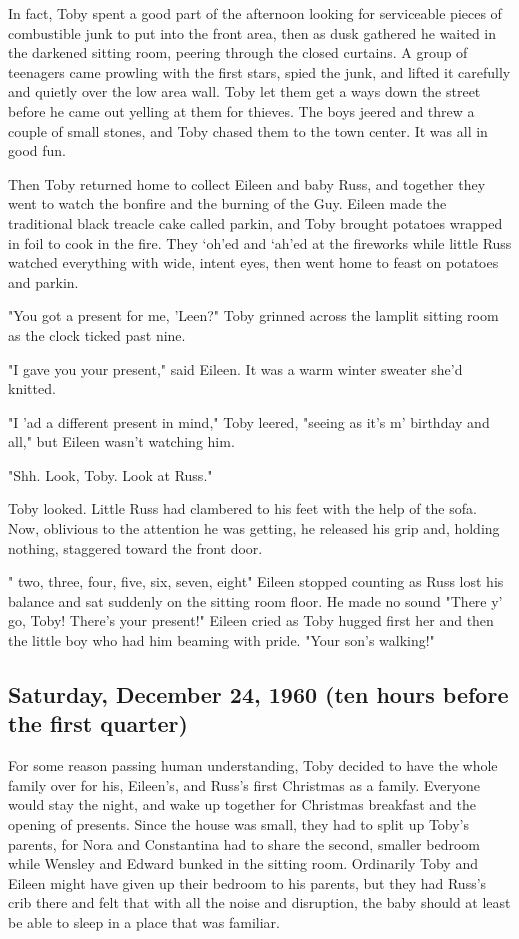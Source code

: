 In fact, Toby spent a good part of the afternoon looking for serviceable pieces of combustible junk to put into the front area, then as dusk gathered he waited in the darkened sitting room, peering through the closed curtains. A group of teenagers came prowling with the first stars, spied the junk, and lifted it carefully and quietly over the low area wall. Toby let them get a ways down the street before he came out yelling at them for thieves. The boys jeered and threw a couple of small stones, and Toby chased them to the town center. It was all in good fun.

Then Toby returned home to collect Eileen and baby Russ, and together they went to watch the bonfire and the burning of the Guy. Eileen made the traditional black treacle cake called parkin, and Toby brought potatoes wrapped in foil to cook in the fire. They `oh'ed and `ah'ed at the fireworks while little Russ watched everything with wide, intent eyes, then went home to feast on potatoes and parkin.

"You got a present for me, 'Leen?" Toby grinned across the lamplit sitting room as the clock ticked past nine.

"I gave you your present," said Eileen. It was a warm winter sweater she'd knitted.

"I 'ad a different present in mind," Toby leered, "seeing as it's m' birthday and all," but Eileen wasn't watching him.

"Shh. Look, Toby. Look at Russ."

Toby looked. Little Russ had clambered to his feet with the help of the sofa. Now, oblivious to the attention he was getting, he released his grip and, holding nothing, staggered toward the front door.

"{\el} two, three, four, five, six, seven, eight{\el}" Eileen stopped counting as Russ lost his balance and sat suddenly on the sitting room floor. He made no sound "There y' go, Toby! There's your present!" Eileen cried as Toby hugged first her and then the little boy who had him beaming with pride. "Your son's walking!"

\subsection{Saturday, December 24, 1960 (ten hours before the first quarter)}

For some reason passing human understanding, Toby decided to have the whole family over for his, Eileen's, and Russ's first Christmas as a family. Everyone would stay the night, and wake up together for Christmas breakfast and the opening of presents. Since the house was small, they had to split up Toby's parents, for Nora and Constantina had to share the second, smaller bedroom while Wensley and Edward bunked in the sitting room. Ordinarily Toby and Eileen might have given up their bedroom to his parents, but they had Russ's crib there and felt that with all the noise and disruption, the baby should at least be able to sleep in a place that was familiar.

